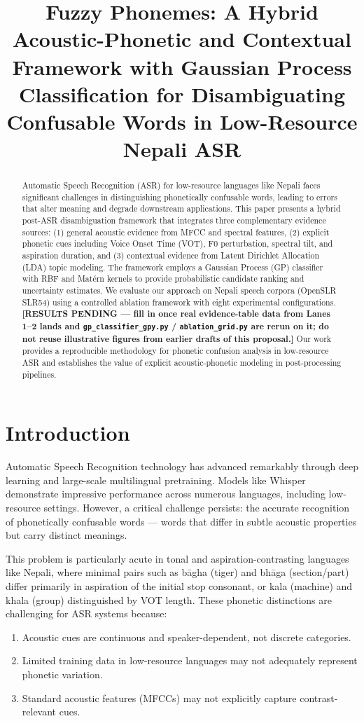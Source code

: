 \documentclass[10pt,conference]{IEEEtran}
\title{Fuzzy Phonemes: A Hybrid Acoustic-Phonetic and Contextual
Framework with Gaussian Process Classification for Disambiguating
Confusable Words in Low-Resource Nepali ASR}
\author{
  \IEEEauthorblockN{Bimochan Raj Kunwar, Utsab Dahal, Sushank Pokhrel}
  \IEEEauthorblockA{Software College of IT \& E-Commerce, Nepal\\
  \texttt{\{bimochan.kunwar, utsab.dahal, sushank.pokhrel\}@softwarica.edu.np}}
}
\begin{document}
\maketitle

\begin{abstract}
Automatic Speech Recognition (ASR) for low-resource languages like Nepali
faces significant challenges in distinguishing phonetically confusable
words, leading to errors that alter meaning and degrade downstream
applications. This paper presents a hybrid post-ASR disambiguation
framework that integrates three complementary evidence sources:
(1) general acoustic evidence from MFCC and spectral features,
(2) explicit phonetic cues including Voice Onset Time (VOT), F0
perturbation, spectral tilt, and aspiration duration, and (3) contextual
evidence from Latent Dirichlet Allocation (LDA) topic modeling. The
framework employs a Gaussian Process (GP) classifier with RBF and
Mat\'ern kernels to provide probabilistic candidate ranking and
uncertainty estimates. We evaluate our approach on Nepali speech corpora
(OpenSLR SLR54) using a controlled ablation framework with eight
experimental configurations.
\textbf{[RESULTS PENDING --- fill in once real evidence-table data from
Lanes 1--2 lands and \texttt{gp\_classifier\_gpy.py} /
\texttt{ablation\_grid.py} are rerun on it; do not reuse illustrative
figures from earlier drafts of this proposal.]}
Our work provides a reproducible methodology for phonetic confusion
analysis in low-resource ASR and establishes the value of explicit
acoustic-phonetic modeling in post-processing pipelines.
\end{abstract}

\section{Introduction}

Automatic Speech Recognition technology has advanced remarkably through
deep learning and large-scale multilingual pretraining. Models like
Whisper~\cite{radford2023whisper} demonstrate impressive performance
across numerous languages, including low-resource settings. However, a
critical challenge persists: the accurate recognition of phonetically
confusable words --- words that differ in subtle acoustic properties but
carry distinct meanings.

This problem is particularly acute in tonal and aspiration-contrasting
languages like Nepali, where minimal pairs such as b\={a}gha (tiger) and
bh\={a}ga (section/part) differ primarily in aspiration of the initial
stop consonant, or kala (machine) and khala (group) distinguished
by VOT length. These phonetic distinctions are challenging for ASR
systems because:
\begin{enumerate}
  \item Acoustic cues are continuous and speaker-dependent, not discrete
        categories.
  \item Limited training data in low-resource languages may not
        adequately represent phonetic variation.
  \item Standard acoustic features (MFCCs) may not explicitly capture
        contrast-relevant cues.
\end{enumerate}
\end{document}
